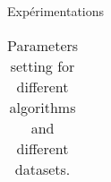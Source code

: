 \documentclass{beamer}
\begin{document}
\begin{frame}{Expérimentations}
	\begin{small}
	\begin{table}[h]
		\caption{Parameters setting for different algorithms and different datasets. }
		
		\begin{center}
			\begin{tabular}{llllll}
				

\end{tabular}
\end{center}
\end{table}
\end{small}
\end{frame}
\end{document}
